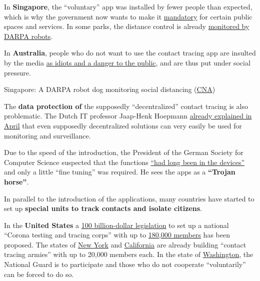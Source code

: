 In \textbf{Singapore}, the ``voluntary'' app was installed by fewer
people than expected, which is why the government now wants to make it
\href{https://www.letemps.ch/economie/singapour-tracage-app-degenere-surveillance-masse}{mandatory}
for certain public spaces and services. In some parks, the distance
control is already
\href{https://www.youtube.com/watch?v=2DJmIjKtVkA}{monitored by DARPA
robots}.

In \textbf{Australia}, people who do not want to use the contact tracing
app are insulted by the media
\href{https://www.news.com.au/world/coronavirus/australia/people-who-refuse-to-download-the-covidsafe-virus-tracing-app-are-the-new-antivaxxers/news-story/541c36fe5cdb56eb1a098b0b9a0dddcc}{as
idiots and a danger to the public}, and are thus put under social
pressure.

Singapore: A DARPA robot dog monitoring social distancing
(\href{https://www.youtube.com/watch?v=2DJmIjKtVkA}{CNA})

The \textbf{data protection of} the supposedly ``decentralized'' contact
tracing is also problematic. The Dutch IT professor Jaap-Henk Hoepmann
\href{http://blog.xot.nl/2020/04/11/stop-the-apple-and-google-contact-tracing-platform-or-be-ready-to-ditch-your-smartphone/}{already
explained in April} that even supposedly decentralized solutions can
very easily be used for monitoring and surveillance.

Due to the speed of the introduction, the President of the German
Society for Computer Science suspected that the functions
\href{https://www.heise.de/news/Informatiker-Die-Corona-App-ist-wie-ein-trojanisches-Pferd-4764560.html}{``had
long been in the devices''} and only a little ``fine tuning'' was
required. He sees the apps as a \textbf{``Trojan horse''}.

In parallel to the introduction of the applications, many countries have
started to set up \textbf{special units to track contacts and isolate
citizens}.

In the \textbf{United States} a
\href{https://heavy.com/news/2020/05/hr-6666-trace-bill-bobby-rush/}{100
billion-dollar legislation} to set up a national ``Corona testing and
tracing corps'' with up to
\href{https://www.washingtonpost.com/opinions/2020/05/29/corona-corps-could-fight-virus-youth-unemployment/}{180,000
members} has been proposed. The states of
\href{https://www.jhsph.edu/news/news-releases/2020/johns-hopkins-and-bloomberg-philanthropies-with-new-york-state-launch-online-course-to-train-army-of-contact-tracers-to-slow-spread-of-COVID-19.html}{New
York} and
\href{https://timesofsandiego.com/tech/2020/05/06/california-training-a-20000-person-army-of-coronavirus-tracers/}{California}
are already building ``contact tracing armies'' with up to 20,000
members each. In the state of
\href{https://lynnwoodtimes.com/2020/05/12/governor-inslee-lays-out-statewide-contact-tracing-plan-for-covid-19/}{Washington},
the National Guard is to participate and those who do not cooperate
``voluntarily'' can be forced to do so.


